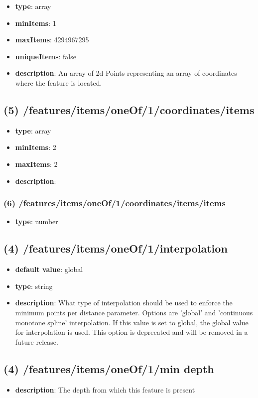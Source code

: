 \begin{itemize}[leftmargin=4em]\item {\bf type}: array
\item {\bf minItems}: 1
\item {\bf maxItems}: 4294967295
\item {\bf uniqueItems}: false
\item {\bf description}: An array of 2d Points representing an array of coordinates where the feature is located.
\end{itemize}\subsection{(5) /features/items/oneOf/1/coordinates/items}
\begin{itemize}[leftmargin=5em]\item {\bf type}: array
\item {\bf minItems}: 2
\item {\bf maxItems}: 2
\item {\bf description}: 
\end{itemize}\subsubsection{(6) /features/items/oneOf/1/coordinates/items/items}
\begin{itemize}[leftmargin=6em]\item {\bf type}: number
\end{itemize}\subsection{(4) /features/items/oneOf/1/interpolation}
\begin{itemize}[leftmargin=4em]\item {\bf default value}: global
\item {\bf type}: string
\item {\bf description}: What type of interpolation should be used to enforce the minimum points per distance parameter. Options are 'global' and 'continuous monotone spline' interpolation. If this value is set to global, the global value for interpolation is used. This option is deprecated and will be removed in a future release.
\end{itemize}\subsection{(4) /features/items/oneOf/1/min depth}
\begin{itemize}[leftmargin=4em]\item {\bf description}: The depth from which this feature is present
\end{itemize}
